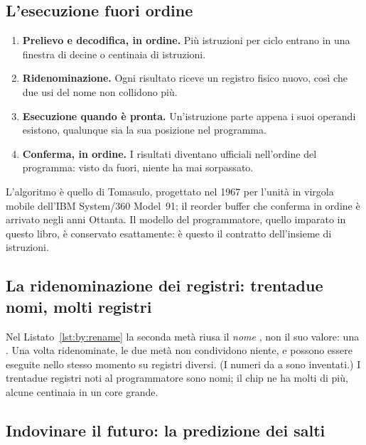 \subsection{L'esecuzione fuori ordine}

\begin{enumerate}
\item \textbf{Prelievo e decodifica, in ordine.} Più istruzioni per ciclo
  entrano in una finestra di decine o centinaia di istruzioni.
\item \textbf{Ridenominazione.} Ogni risultato riceve un registro fisico nuovo,
  così che due usi del nome  non collidono più.
\item \textbf{Esecuzione quando è pronta.} Un'istruzione parte appena i suoi
  operandi esistono, qualunque sia la sua posizione nel programma.
\item \textbf{Conferma, in ordine.} I risultati diventano ufficiali nell'ordine
  del programma: visto da fuori, niente ha mai sorpassato.
\end{enumerate}

L'algoritmo è quello di Tomasulo, progettato nel 1967 per l'unità in virgola
mobile dell'IBM System/360 Model~91; il reorder buffer che conferma in ordine è
arrivato negli anni Ottanta. Il modello del programmatore, quello imparato in
questo libro, è conservato esattamente: è questo il contratto dell'insieme di
istruzioni.

\subsection{La ridenominazione dei registri: trentadue nomi, molti registri}


Nel Listato~\ref{lst:by:rename} la seconda metà riusa il \emph{nome}
, non il suo valore: una . Una volta
ridenominate, le due metà non condividono niente, e possono essere eseguite
nello stesso momento su registri diversi. (I numeri da  a 
sono inventati.) I trentadue registri noti al programmatore sono nomi; il chip
ne ha molti di più, alcune centinaia in un core grande.

\subsection{Indovinare il futuro: la predizione dei salti}

